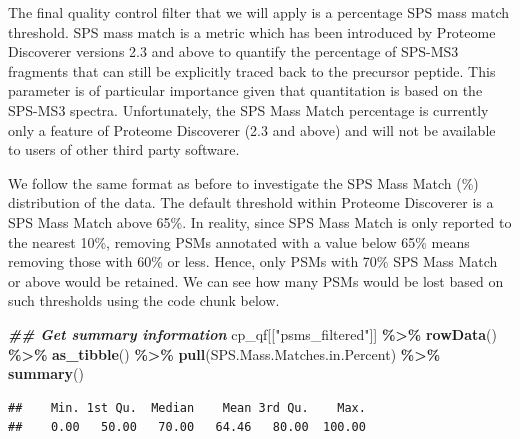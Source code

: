 \documentclass[9pt,a4paper,]{extarticle}
\newenvironment{Shaded}{\begin{snugshade}}{\end{snugshade}}
\newcommand{\DocumentationTok}[1]{\textcolor[rgb]{0.56,0.35,0.01}{\textbf{\textit{#1}}}}
\newcommand{\FunctionTok}[1]{\textcolor[rgb]{0.13,0.29,0.53}{\textbf{#1}}}
\newcommand{\NormalTok}[1]{#1}
\newcommand{\SpecialCharTok}[1]{\textcolor[rgb]{0.81,0.36,0.00}{\textbf{#1}}}
\newcommand{\StringTok}[1]{\textcolor[rgb]{0.31,0.60,0.02}{#1}}
\begin{document}
The final quality control filter that we will apply is a percentage SPS mass
match threshold. SPS mass match is a metric which has been introduced by
Proteome Discoverer versions 2.3 and above to quantify the percentage of SPS-MS3
fragments that can still be explicitly traced back to the precursor peptide.
This parameter is of particular importance given that quantitation is based on
the SPS-MS3 spectra. Unfortunately, the SPS Mass Match percentage is currently
only a feature of Proteome Discoverer (2.3 and above) and will not be available
to users of other third party software.

We follow the same format as before to investigate the SPS Mass Match (\%)
distribution of the data. The default threshold within Proteome Discoverer is a
SPS Mass Match above 65\%. In reality, since SPS Mass Match is only reported to
the nearest 10\%, removing PSMs annotated with a value below 65\% means removing
those with 60\% or less. Hence, only PSMs with 70\% SPS Mass Match or above would
be retained. We can see how many PSMs would be lost based on such thresholds
using the code chunk below.

\begin{Shaded}
\begin{Highlighting}[]
\DocumentationTok{\#\# Get summary information}
\NormalTok{cp\_qf[[}\StringTok{"psms\_filtered"}\NormalTok{]] }\SpecialCharTok{\%\textgreater{}\%} 
  \FunctionTok{rowData}\NormalTok{() }\SpecialCharTok{\%\textgreater{}\%} 
  \FunctionTok{as\_tibble}\NormalTok{() }\SpecialCharTok{\%\textgreater{}\%} 
  \FunctionTok{pull}\NormalTok{(SPS.Mass.Matches.in.Percent) }\SpecialCharTok{\%\textgreater{}\%} 
  \FunctionTok{summary}\NormalTok{()}
\end{Highlighting}
\end{Shaded}

\begin{verbatim}
##    Min. 1st Qu.  Median    Mean 3rd Qu.    Max. 
##    0.00   50.00   70.00   64.46   80.00  100.00
\end{verbatim}
\end{document}

